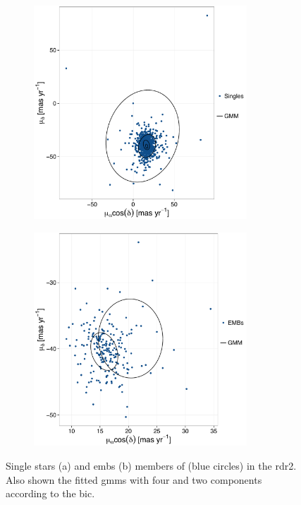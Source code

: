 \begin{figure}[ht!]
    \centering
       \begin{subfigure}[t]{0.48\textwidth}
      \includegraphics[page=1,height=8cm,width=\textwidth]{background/Figures/BIC_PM_Cs_fit.pdf}
        \caption{}
    \end{subfigure}
     \begin{subfigure}[t]{0.48\textwidth}
      \includegraphics[page=1,height=8cm,width=\textwidth]{background/Figures/BIC_PM_Bs_fit.pdf}
        \caption{}
    \end{subfigure}
\caption{Single stars (a) and \glspl{emb} (b) members of \citet{Bouy2015} (blue circles) in the \gls{rdr2}. Also shown the fitted \glspl{gmm} with four and two components according to the \gls{bic}.}
\label{fig:fitPM}
\end{figure}


